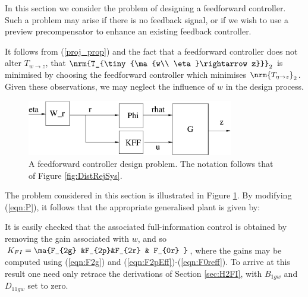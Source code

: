 \label{sec:Preproc}
In this section we consider the problem of designing a feedforward controller. Such a problem may arise if there is no feedback signal, or if we wish to use a preview precompensator to enhance an existing feedback controller. 

It follows from (\ref{proj_prop}) and the fact that a feedforward controller does not alter $T_{w\rightarrow z}$, that $\nrm{T_{\tiny{\ma{w\\ \eta}\rightarrow z}}}_2$ is minimised by choosing the feedforward controller which minimises $\nrm{T_{\eta \rightarrow z}}_2$. Given these observations, we may neglect the influence of $w$ in the design process.

\begin{figure}
\begin{center}
\stdcontrolfrags
{}
\includegraphics[width=9cm]{./diags/DistRejSysFF.eps}
\end{center}
\caption{A feedforward controller design problem. The notation follows that of Figure \ref{fig:DistRejSys}.\label{fig:DistRejSysFF}}
\end{figure}

The problem considered in this section is illustrated in Figure \ref{fig:DistRejSysFF}. By modifying (\ref{eqn:P}), it follows that the appropriate generalised plant is given by:

It is easily checked that the associated full-information control is obtained by removing the gain associated with $w$, and so  $K_{FI}=\ma{F_{2g} &F_{2p}&F_{2r} & F_{0r} }$, where the gains may be computed using (\ref{eqn:F2g}) and (\ref{eqn:F2pEff})-(\ref{eqn:F0reff}). To arrive at this result one need only retrace the derivations of Section \ref{sec:H2FI}, with $B_{1gw}$ and $D_{11gw}$ set to zero.

